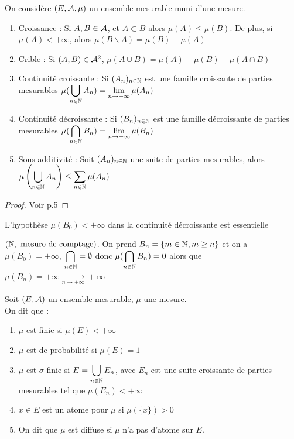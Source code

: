 \documentclass[]{report}
\begin{document}
\begin{prop}
    On considère $(E,\mathcal{A},\mu)$ un ensemble mesurable muni d'une mesure.
    \begin{enumerate}
        \item Croissance : Si $A,B\in\mathcal{A}$, et $A\subset B$ alors $\mu(A)\le\mu(B)$. De plus, si $\mu(A)<+\infty$, alors $\mu(B\backslash A)=\mu(B)-\mu(A)$
        \item Crible : Si $(A,B)\in\mathcal{A}^2$, $\mu(A\cup B)=\mu(A)+\mu(B)-\mu(A\cap B)$
        \item Continuité croissante : Si $(A_n)_{{n\in\mathbb{N}}}$ est une famille croissante de parties mesurables $\displaystyle{\mu(\bigcup_{{n\in\mathbb{N}}}A_n)=\lim_{n\to+\infty}\mu(A_n)}$
        \item Continuité décroissante : Si $(B_n)_{{n\in\mathbb{N}}}$ est une famille décroissante de parties mesurables $\displaystyle{\mu(\bigcap_{{n\in\mathbb{N}}}B_n)=\lim_{n\to+\infty}\mu(B_n)}$
        \item Sous-additivité : Soit $(A_n)_{{n\in\mathbb{N}}}$ une suite de parties mesurables, alors $\displaystyle{\mu\left(\bigcup_{{n\in\mathbb{N}}}A_n\right)\le\sum_{{n\in\mathbb{N}}}\mu(A_n)}$
    \end{enumerate}
\end{prop}

\begin{proof}
    Voir p.5
\end{proof}

\begin{re}
    L'hypothèse $\mu(B_0)<+\infty$ dans la continuité décroissante est essentielle
\end{re}

\begin{ex}
    $(\mathbb{N},\text{ mesure de comptage})$. On prend $B_n=\{m\in\mathbb{N},m\ge n\}$ et on a $\mu(B_0)=+\infty$, $\displaystyle{\bigcap_{{n\in\mathbb{N}}}=\emptyset}$ donc $\displaystyle{\mu(\bigcap_{{n\in\mathbb{N}}}B_n)=0}$ alors que $\displaystyle{\mu(B_n)=+\infty\xrightarrow[n\to+\infty]{}+\infty}$
\end{ex}

\begin{df}
    Soit $(E,\mathcal{A})$ un ensemble mesurable, $\mu$ une mesure.\\
    On dit que :
    \begin{enumerate}
        \item $\mu$ est finie si $\mu(E)<+\infty$
        \item $\mu$ est de probabilité si $\mu(E)=1$
        \item $\mu$ est $\sigma$-finie si $\displaystyle{E=\bigcup_{{n\in\mathbb{N}}}E_n}$, avec $E_n$ est une suite croissante de parties mesurables tel que $\mu(E_n)<+\infty$
        \item $x\in E$ est un atome pour $\mu$ si $\mu(\{x\})>0$
        \item On dit que $\mu$ est diffuse si $\mu$ n'a pas d'atome sur $E$.
    \end{enumerate}
\end{df}
\end{document}
